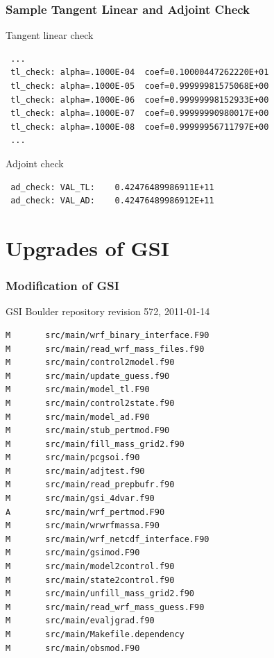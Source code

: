 \documentclass{beamer}
\begin{document}
\begin{frame}[fragile]
\frametitle{Sample Tangent Linear and Adjoint Check }
\begin{beamerboxesrounded}[ lower=postit,shadow=true]{Tangent linear check}
\begin{verbatim}
 ...
 tl_check: alpha=.1000E-04  coef=0.10000447262220E+01  
 tl_check: alpha=.1000E-05  coef=0.99999981575068E+00
 tl_check: alpha=.1000E-06  coef=0.99999998152933E+00
 tl_check: alpha=.1000E-07  coef=0.99999990980017E+00
 tl_check: alpha=.1000E-08  coef=0.99999956711797E+00
 ...
\end{verbatim}
\end{beamerboxesrounded}
\begin{beamerboxesrounded}[ lower=postit,shadow=true]{Adjoint check}
\begin{verbatim}
 ad_check: VAL_TL:    0.42476489986911E+11
 ad_check: VAL_AD:    0.42476489986912E+11
\end{verbatim}
\end{beamerboxesrounded}
\end{frame}

\section{Upgrades of GSI}

\begin{frame}[fragile]
\frametitle{Modification of GSI}
GSI Boulder repository revision 572, 2011-01-14
\begin{beamerboxesrounded}[ lower=postit,shadow=true]{}
{\tiny
\begin{verbatim}
M       src/main/wrf_binary_interface.F90
M       src/main/read_wrf_mass_files.f90
M       src/main/control2model.f90
M       src/main/update_guess.f90
M       src/main/model_tl.F90
M       src/main/control2state.f90
M       src/main/model_ad.F90
M       src/main/stub_pertmod.F90
M       src/main/fill_mass_grid2.f90
M       src/main/pcgsoi.f90
M       src/main/adjtest.f90
M       src/main/read_prepbufr.f90
M       src/main/gsi_4dvar.f90
A       src/main/wrf_pertmod.F90
M       src/main/wrwrfmassa.F90
M       src/main/wrf_netcdf_interface.F90
M       src/main/gsimod.F90
M       src/main/model2control.f90
M       src/main/state2control.f90
M       src/main/unfill_mass_grid2.f90
M       src/main/read_wrf_mass_guess.F90
M       src/main/evaljgrad.f90
M       src/main/Makefile.dependency
M       src/main/obsmod.F90
\end{verbatim}
}
\end{beamerboxesrounded}
\end{frame}
\end{document}
